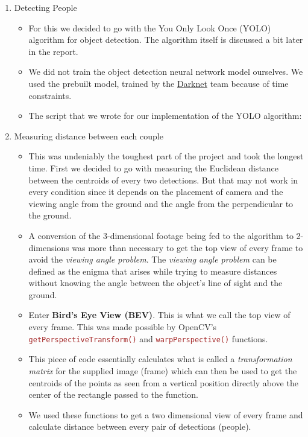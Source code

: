 \documentclass[a4paper]{article}
\begin{document}
\begin{enumerate}
    \item Detecting People
          \begin{itemize}
              \item For this we decided to go with the You Only Look Once (YOLO) algorithm for object detection. The algorithm itself is discussed a bit later in the report.
              \item We did not train the object detection neural network model ourselves. We used the prebuilt model, trained by the \href{https://pjreddie.com/darknet/yolo/}{Darknet} team because of time constraints.
			\item The script that we wrote for our implementation of the YOLO algorithm:
              
          \end{itemize}

    \item Measuring distance between each couple
          \begin{itemize}
              \item This was undeniably the toughest part of the project and took the longest time. First we decided to go with measuring the Euclidean distance between the centroids of every two detections. But that may not work in every condition since it depends on the placement of camera and the viewing angle from the ground and the angle from the perpendicular to the ground.
              \item A conversion of the 3-dimensional footage being fed to the algorithm to 2-dimensions was more than necessary to get the top view of every frame to avoid the \textit{viewing angle problem}. The \textit{viewing angle problem} can be defined as the enigma that arises while trying to measure distances without knowing the angle between the object's line of sight and the ground.
              \pagebreak
              \item Enter \textbf{Bird's Eye View (BEV)}. This is what we call the top view of every frame. This was made possible by OpenCV's \textcolor{brown}{\texttt{getPerspectiveTransform()}} and \textcolor{brown}{\texttt{warpPerspective()}} functions.
                    
              \item This piece of code essentially calculates what is called a \textit{transformation matrix}\cite{kriegman2007homography} for the supplied image (frame) which can then be used to get the centroids of the points as seen from a vertical position directly above the center of the rectangle passed to the function.
                    
              \item We used these functions to get a two dimensional view of every frame and calculate distance between every pair of detections (people).
          \end{itemize}


\end{enumerate}
\end{document}
